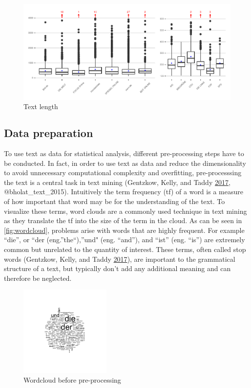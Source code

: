 \documentclass[
]{article}
\begin{document}
\begin{figure}

{\centering \includegraphics[width=1\linewidth]{main_text_files/figure-latex/text_length-1} 

}

\caption{Text length \label{fig:text_length}}\label{fig:text_length}
\end{figure}

\hypertarget{data-preparation}{%
\subsection{Data preparation}\label{data-preparation}}

To use text as data for statistical analysis, different pre-processing
steps have to be conducted. In fact, in order to use text as data and
reduce the dimensionality to avoid unnecessary computational complexity
and overfitting, pre-processsing the text is a central task in text
mining (Gentzkow, Kelly, and Taddy
\protect\hyperlink{ref-gentzkow_text_2017}{2017}, @bholat\_text\_2015).
Intuitively the term frequency (tf) of a word is a measure of how
important that word may be for the understanding of the text. To
visualize these terms, word clouds are a commonly used technique in text
mining as they translate the tf into the size of the term in the cloud.
As can be seen in \autoref{fig:wordcloud}, problems arise with words
that are highly frequent. For example ``die'', or ``der
(eng.''the``),''und" (eng. ``and''), and ``ist'' (eng. ``is'') are
extremely common but unrelated to the quantity of interest. These terms,
often called stop words (Gentzkow, Kelly, and Taddy
\protect\hyperlink{ref-gentzkow_text_2017}{2017}), are important to the
grammatical structure of a text, but typically don't add any additional
meaning and can therefore be neglected.

\begin{figure}
\centering
\includegraphics[width=0.4\textwidth,height=\textheight]{../figs/wordcloud.png}
\caption{Wordcloud before pre-processing}
\end{figure}
\end{document}
